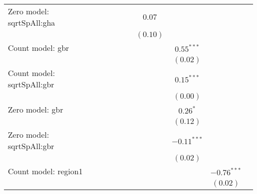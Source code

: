 \begin{table}
\begin{center}
{\begin{tabular}{l c c c c c c c c c}
Zero model: sqrtSpAll:gha      &               &               &               &                 &               & $0.07$          &                 &               &               \\
                               &               &               &               &                 &               & $(0.10)$        &                 &               &               \\
Count model: gbr               &               &               &               &                 &               &                 & $0.55^{***}$    &               &               \\
                               &               &               &               &                 &               &                 & $(0.02)$        &               &               \\
Count model: sqrtSpAll:gbr     &               &               &               &                 &               &                 & $0.15^{***}$    &               &               \\
                               &               &               &               &                 &               &                 & $(0.00)$        &               &               \\
Zero model: gbr                &               &               &               &                 &               &                 & $0.26^{*}$      &               &               \\
                               &               &               &               &                 &               &                 & $(0.12)$        &               &               \\
Zero model: sqrtSpAll:gbr      &               &               &               &                 &               &                 & $-0.11^{***}$   &               &               \\
                               &               &               &               &                 &               &                 & $(0.02)$        &               &               \\
Count model: region1           &               &               &               &                 &               &                 &                 & $-0.76^{***}$ &               \\
                               &               &               &               &                 &               &                 &                 & $(0.02)$      &               \\

\end{tabular}}
\end{center}
\end{table}
